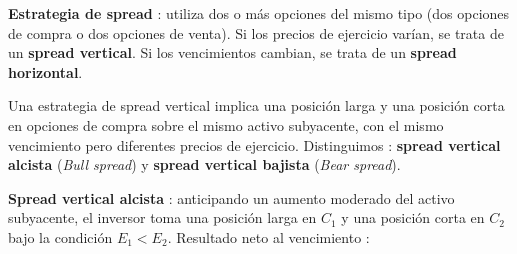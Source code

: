 \begin{f}
\textbf{Estrategia de spread} : utiliza dos o más opciones del mismo tipo (dos opciones de compra o dos opciones de venta).  
Si los precios de ejercicio varían, se trata de un \textbf{spread vertical}.  
Si los vencimientos cambian, se trata de un \textbf{spread horizontal}.

Una estrategia de spread vertical implica una posición larga y una posición corta en opciones de compra sobre el mismo activo subyacente, con el mismo vencimiento pero diferentes precios de ejercicio.
Distinguimos : \textbf{spread vertical alcista} (\textit{Bull spread}) y \textbf{spread vertical bajista} (\textit{Bear spread}).

\textbf{Spread vertical alcista} : anticipando un aumento moderado del activo subyacente, el inversor toma una posición larga en \(C_1\) y una posición corta en \(C_2\) bajo la condición \(E_1 < E_2\).  
Resultado neto al vencimiento :


\end{f}
